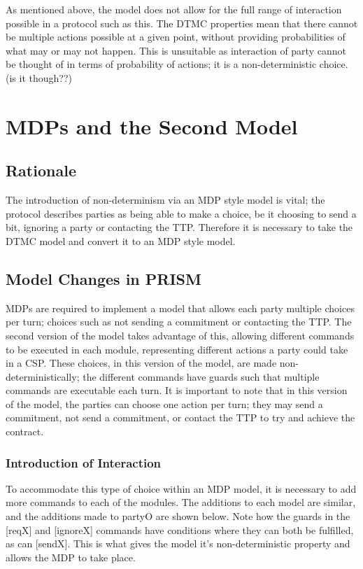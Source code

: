 \documentclass{l4proj}
\begin{document}
As mentioned above, the model does not allow for the full range of interaction possible in a protocol such as this. The DTMC properties mean that there cannot be multiple actions possible at a given point, without providing probabilities of what may or may not happen. This is unsuitable as interaction of party cannot be thought of in terms of probability of actions; it is a non-deterministic choice. (is it though??) 
\chapter{MDPs and the Second Model}

\section{Rationale}
The introduction of non-determinism via an MDP style model is vital; the protocol describes parties as being able to make a choice, be it choosing to send a bit, ignoring a party or contacting the TTP. Therefore it is necessary to take the DTMC model and convert it to an MDP style model. 


\section{Model Changes in PRISM}

MDPs are required to implement a model that allows each party multiple choices per turn; choices such as not sending a commitment or contacting the TTP. The second version of the model takes advantage of this, allowing different commands to be executed in each module, representing different actions a party could take in a CSP. These choices, in this version of the model, are made non-deterministically; the different commands have guards such that multiple commands are executable each turn. It is important to note that in this version of the model, the parties can choose one action per turn; they may send a commitment, not send a commitment, or contact the TTP to try and achieve the contract.

\subsection{Introduction of Interaction}

To accommodate this type of choice within an MDP model, it is necessary to add more commands to each of the modules. The additions to each model are similar, and the additions made to partyO are shown below. Note how the guards in the [reqX] and [ignoreX] commands have conditions where they can both be fulfilled, as can [sendX]. This is what gives the model it's non-deterministic property and allows the MDP to take place.
\end{document}
